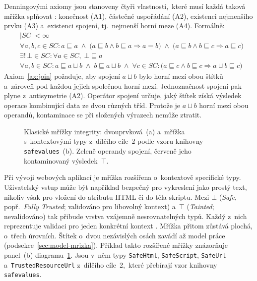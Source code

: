 Denningovými axiomy jsou stanoveny čtyři vlastnosti,~které musí každá taková mřížka splňovat \parencite{denning1976lattice}: konečnost (A1), částečné uspořádání (A2), existenci nejmenšího prvku (A3) a~existenci spojení, tj.~nejmenší horní meze (A4). Formálně:
\begin{align}
    & |SC| < \infty \tag{A1} \label{ax:finitness} \\[2pt]
    & \forall a, b, c \in SC : a \sqsubseteq a \;\wedge\; \bigl(a \sqsubseteq b \wedge b \sqsubseteq a \Rightarrow a = b\bigr) \;\wedge\; \bigl(a \sqsubseteq b \wedge b \sqsubseteq c \Rightarrow a \sqsubseteq c\bigr) \tag{A2} \label{ax:order} \\[2pt]
    & \exists!\,\bot \in SC : \forall a \in SC,\; \bot \sqsubseteq a \tag{A3} \label{ax:bottom} \\[2pt]
    & \forall a, b \in SC : a \sqsubseteq a \sqcup b \;\wedge\; b \sqsubseteq a \sqcup b \;\wedge\; \forall c \in SC : \bigl(a \sqsubseteq c \wedge b \sqsubseteq c \Rightarrow a \sqcup b \sqsubseteq c\bigr) \tag{A4} \label{ax:join}
\end{align}
Axiom~\ref{ax:join} požaduje, aby spojení $a \sqcup b$ bylo horní mezí obou štítků a~zároveň pod každou jejich společnou horní mezí. Jednoznačnost spojení pak plyne z~antisymetrie (A2). Operátor spojení určuje, jaký štítek získá výsledek operace kombinující data ze dvou různých tříd. Protože je $a \sqcup b$ horní mezí obou operandů, kontaminace se při složených výrazech nemůže ztratit.

\begin{figure}[htbp]
    \centering
    \caption[Klasické mřížky integrity]{Klasické mřížky integrity: dvouprvková~(a) a~mřížka s~kontextovými typy z~dílčího cíle~2 podle vzoru knihovny \texttt{safevalues}~(b). Zeleně operandy spojení, červeně jeho kontaminovaný výsledek~$\top$.}
    \label{fig:mrizka-klasicka}
\end{figure}

Při vývoji webových aplikací je mřížka rozšířena o~kontextově specifické typy. Uživatelský vstup může být například bezpečný pro vykreslení jako prostý text, nikoliv však pro vložení do atributu HTML či do těla skriptu. Mezi $\bot$ (\emph{Safe}, popř.~\emph{Fully Trusted}; validováno pro libovolný kontext) a~$\top$ (\emph{Tainted}; nevalidováno) tak přibude vrstva vzájemně nesrovnatelných typů. Každý z~nich reprezentuje validaci pro jeden konkrétní kontext \parencite{googleSafevalues}. Mřížka přitom zůstává plochá, o~třech úrovních. Štítek o~dvou nezávislých osách zavádí až model práce (podsekce~\ref{sec:model-mrizka}). Příklad takto rozšířené mřížky znázorňuje panel~(b) diagramu~\ref{fig:mrizka-klasicka}. Jsou v~něm typy \texttt{SafeHtml}, \texttt{SafeScript}, \texttt{SafeUrl} a~\texttt{TrustedResourceUrl} z~dílčího cíle~2,~které přebírají vzor knihovny \texttt{safevalues}.

